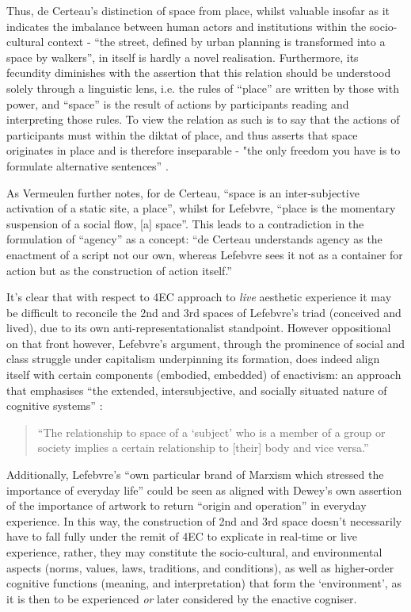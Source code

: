 Thus, de Certeau's distinction of space from place, whilst valuable insofar as it indicates the imbalance between human actors and institutions within the socio-cultural context - “the street, defined by urban planning is transformed into a space by walkers”, in itself is hardly a novel realisation. Furthermore, its fecundity diminishes with the assertion that this relation should be understood solely through a linguistic lens, i.e. the rules of “place” are written by those with power, and “space” is the result of actions by participants reading and interpreting those rules. To view the relation as such is to say that the actions of participants must within the diktat of place, and thus asserts that space originates in place and is therefore inseparable - "the only freedom you have is to formulate alternative sentences” \citep{vermeulen2015}. 

As Vermeulen further notes, for de Certeau, “space is an inter-subjective activation of a static site, a place”, whilst for Lefebvre, “place is the momentary suspension of a social flow, [a] space”. This leads to a contradiction in the formulation of “agency” as a concept: “de Certeau understands agency as the enactment of a script not our own, whereas Lefebvre sees it not as a container for action but as the construction of action itself.” 

It’s clear that with respect to 4EC approach to \textit{live} aesthetic experience it may be difficult to reconcile the 2nd and 3rd spaces of Lefebvre’s triad (conceived and lived), due to its own anti-representationalist standpoint. However oppositional on that front however, Lefebvre’s argument, through the prominence of social and class struggle under capitalism underpinning its formation, does indeed align itself with certain components (embodied, embedded) of enactivism: an approach that emphasises “the extended, intersubjective, and socially situated nature of cognitive systems” \citep[p. 6]{gallagher2017}: 
\begin{quote}
    “The relationship to space of a ‘subject’ who is a member of a group or society implies a certain relationship to [their] body and vice versa.” \cite[p. 40]{lefebvre1991}
\end{quote}
Additionally, Lefebvre’s “own particular brand of Marxism which stressed the importance of everyday life” \citep[p. 8]{merrifield1993} could be seen as aligned with Dewey’s own assertion of the importance of artwork to return “origin and operation” in everyday experience. In this way, the construction of 2nd and 3rd space doesn't necessarily have to fall fully under the remit of 4EC to explicate in real-time or live experience, rather, they may constitute the socio-cultural, and environmental aspects (norms, values, laws, traditions, and  conditions), as well as higher-order cognitive functions (meaning, and interpretation) that form the ‘environment’, as it is then to be experienced \textit{or} later considered by the enactive cogniser.

